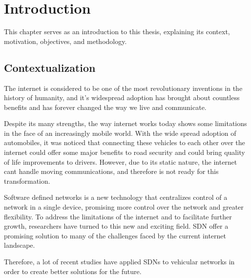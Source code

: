 
%

\chapter{Introduction}
\label{cha:introduction}

This chapter serves as an introduction to this thesis, explaining its context, motivation, objectives, and methodology.

\section{Contextualization} %
\label{sec:contex}

The internet is considered to be one of the most revolutionary inventions in the history of humanity, and it's widespread adoption has brought about countless benefits and has forever changed the way we live and communicate. 

Despite its many strengths, the way internet works today  shows some limitations in the face of an increasingly mobile world. With the wide spread adoption of automobiles, it was noticed that connecting these vehicles to each other over the internet could offer some major benefits to road security and could bring quality of life improvements to drivers. However, due to its static nature, the internet cant handle moving communications, and therefore is not ready for this transformation.

Software defined networks is a new technology that centralizes control of a network in a single device, promising more control over the network and greater flexibility. To address the limitations of the internet and to facilitate further growth, researchers have turned to this new and exciting field. SDN offer a promising solution to many of the challenges faced by the current internet landscape.

Therefore, a lot of recent studies have applied SDNs to vehicular networks in order to create better solutions for the future.

